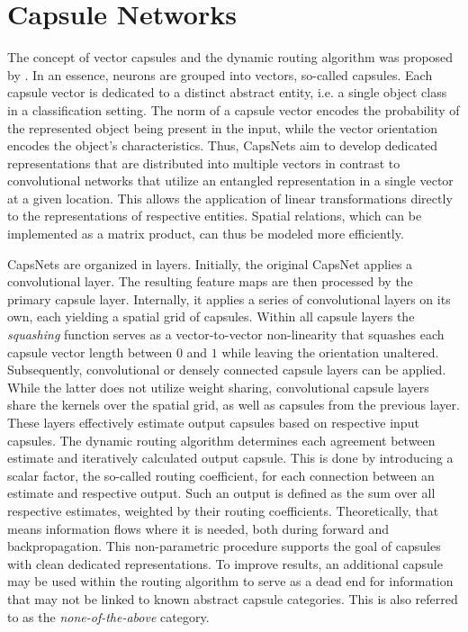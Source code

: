 
\section{Capsule Networks}


The concept of vector capsules and the dynamic routing algorithm was proposed by \citet{capsules}. In an essence, neurons are grouped into vectors, so-called capsules. Each capsule vector is dedicated to a distinct abstract entity, i.e. a single object class in a classification setting. The norm of a capsule vector encodes the probability of the represented object being present in the input, while the vector orientation encodes the object's characteristics. Thus, CapsNets aim to develop dedicated representations that are distributed into multiple vectors in contrast to convolutional networks that utilize an entangled representation in a single vector at a given location. This allows the application of linear transformations directly to the representations of respective entities. Spatial relations, which can be implemented as a matrix product, can thus be modeled more efficiently.

CapsNets are organized in layers. Initially, the original CapsNet applies a convolutional layer. The resulting feature maps are then processed by the primary capsule layer. Internally, it applies a series of convolutional layers on its own, each yielding a spatial grid of capsules. Within all capsule layers the \emph{squashing} function serves as a vector-to-vector non-linearity that squashes each capsule vector length between $0$ and $1$ while leaving the orientation unaltered. Subsequently, convolutional or densely connected capsule layers can be applied. While the latter does not utilize weight sharing, convolutional capsule layers share the kernels over the spatial grid, as well as capsules from the previous layer. These layers effectively estimate output capsules based on respective input capsules. The dynamic routing algorithm determines each agreement between estimate and iteratively calculated output capsule. This is done by introducing a scalar factor, the so-called routing coefficient, for each connection between an estimate and respective output. Such an output is defined as the sum over all respective estimates, weighted by their routing coefficients. Theoretically, that means information flows where it is needed, both during forward and backpropagation. This non-parametric procedure supports the goal of capsules with clean dedicated representations. To improve results, an additional capsule may be used within the routing algorithm to serve as a dead end for information that may not be linked to known abstract capsule categories. This is also referred to as the \emph{none-of-the-above} category.

